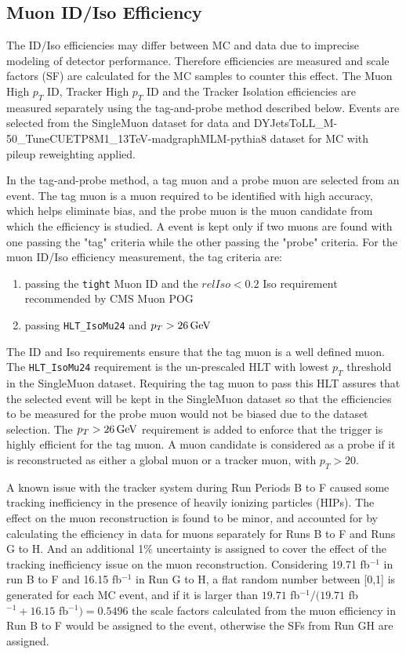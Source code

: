 \subsection{Muon ID/Iso Efficiency}
The ID/Iso efficiencies may differ between MC and data due to imprecise modeling of detector performance. Therefore efficiencies are measured and scale factors (SF) are calculated for the MC samples to counter this effect. The Muon High $p_T$ ID, Tracker High $p_T$ ID and the Tracker Isolation efficiencies are measured separately using the tag-and-probe method described below. Events are selected from the SingleMuon dataset for data and DYJetsToLL\_M-50\_TuneCUETP8M1\_13TeV-madgraphMLM-pythia8 dataset for MC with pileup reweighting applied. 

\vspace{0.3cm}
In the tag-and-probe method, a tag muon and a probe muon are selected from an event. The tag muon is a muon required to be identified with high accuracy, which helps eliminate bias, and the probe muon is the muon candidate from which the efficiency is studied. A event is kept only if two muons are found with one passing the "tag" criteria while the other passing the "probe" criteria. For the muon ID/Iso efficiency measurement, the tag criteria are:
\begin{enumerate}
\item passing the \texttt{tight} Muon ID and the $relIso<0.2$ Iso requirement recommended by CMS Muon POG
\item passing \texttt{HLT\_IsoMu24} and $p_T > 26\,\text{Ge\hspace{-.08em}V}$
\end{enumerate}

The ID and Iso requirements ensure that the tag muon is a well defined muon. The \texttt{HLT\_IsoMu24} requirement is the un-prescaled HLT with lowest $p_T$ threshold in the SingleMuon dataset. Requiring the tag muon to pass this HLT assures that the selected event will be kept in the SingleMuon dataset so that the efficiencies to be measured for the probe muon would not be biased due to the dataset selection. The $p_T > 26\,\text{Ge\hspace{-.08em}V}$ requirement is added to enforce that the trigger is highly efficient for the tag muon. A muon candidate is considered as a probe if it is reconstructed as either a global muon or a tracker muon, with $p_T > 20$\GeV.

\vspace{0.3cm}
A known issue with the tracker system during Run Periods B to F caused some tracking inefficiency in the presence of heavily ionizing particles (HIPs). The effect on the muon reconstruction is found to be minor, and accounted for by calculating the efficiency in data for muons separately for Runs B to F and Runs G to H. And an additional 1\% uncertainty is assigned to cover the effect of the tracking inefficiency issue on the muon reconstruction. Considering 19.71 fb$^{-1}$ in run B to F and 16.15 fb$^{-1}$ in Run G to H, a flat random number between [0,1] is generated for each MC event, and if it is larger than $19.71$ fb$^{-1}/(19.71$ fb$^{-1}+16.15$ fb$^{-1})=0.5496$ the scale factors calculated from the muon efficiency in Run B to F would be assigned to the event, otherwise the SFs from Run GH are assigned.

